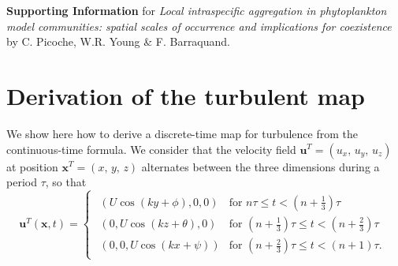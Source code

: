 \documentclass[english]{article}
\date{}
\newcommand{\bx}{\boldsymbol{x}}
\begin{document}
\textbf{Supporting Information} for \textit{Local intraspecific aggregation
in phytoplankton model communities: spatial scales of occurrence and
implications for coexistence}\emph{ }by C. Picoche, W.R. Young \&
F. Barraquand.

\renewcommand\thesection{S\arabic{section}}
\setcounter{section}{0}
\renewcommand\thefigure{S\arabic{figure}}
\setcounter{figure}{0}
\renewcommand\theequation{S\arabic{equation}}
\setcounter{equation}{0}

\section{Derivation of the turbulent map}

We show here how to derive a discrete-time map for turbulence from
the continuous-time formula. We consider that the velocity field $\textbf{u}^{T}=(u_{x},\,u_{y},\,u_{z})$
at position $\bx^{T}=(x,\,y,\,z)$ alternates between the three
dimensions during a period $\tau$, so that
\begin{equation}
\textbf{u}^{T}(\bx,t)=\begin{cases}
\begin{array}{cc}
\left(U\cos(ky+\phi),0,0\right) & \text{for }n\tau\leq t<(n+\frac{1}{3})\tau\\
\left(0,U\cos(kz+\theta),0\right) & \text{for }(n+\frac{1}{3})\tau\leq t<(n+\frac{2}{3})\tau\\
\left(0,0,U\cos(kx+\psi)\right) & \text{for }(n+\frac{2}{3})\tau\leq t<(n+1)\tau.
\end{array}\end{cases}\label{eq:pierrehumber_continuous_time}
\end{equation}
\end{document}
